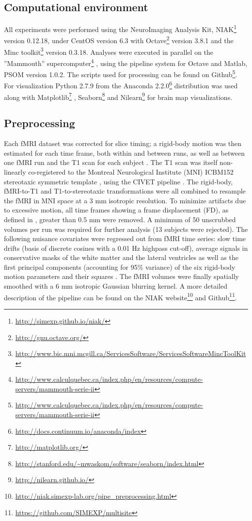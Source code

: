 \documentclass[authoryear]{elsarticle}
\begin{document}
\subsection{Computational environment}
All experiments were performed using the NeuroImaging Analysis Kit, NIAK\footnote{\url{http://simexp.github.io/niak/}} \citep{Bellec2011} version 0.12.18, under CentOS version 6.3 with Octave\footnote{\url{http://gnu.octave.org/}} version 3.8.1 and the Minc toolkit\footnote{\url{http://www.bic.mni.mcgill.ca/ServicesSoftware/ServicesSoftwareMincToolKit}} version 0.3.18. Analyses were executed in parallel on the ”Mammouth” supercomputer\footnote{\url{http://www.calculquebec.ca/index.php/en/resources/compute-servers/mammouth-serie-ii}} , using the pipeline system for Octave and Matlab, PSOM \citep{Bellec2012} version 1.0.2. The scripts used for processing can be found on Github\footnote{\url{http://www.calculquebec.ca/index.php/en/resources/compute-servers/mammouth-serie-ii}}. For visualization Python 2.7.9 from the Anaconda 2.2.0\footnote{\url{http://docs.continuum.io/anaconda/index}} distribution was used along with Matplotlib\footnote{\url{http://matplotlib.org/}} \citep{matplotlib}, Seaborn\footnote{\url{http://stanford.edu/~mwaskom/software/seaborn/index.html}} and Nilearn\footnote{\url{http://nilearn.github.io/}} for brain map visualizations.

\subsection{Preprocessing}
Each fMRI dataset was corrected for slice timing; a rigid-body motion was then estimated for each time frame, both within and between runs, as well as between one fMRI run and the T1 scan for each subject \citep{Collins1994}. The T1 scan was itself non-linearly co-registered to the Montreal Neurological Institute (MNI) ICBM152 stereotaxic symmetric template \citep{Fonov2011}, using the CIVET pipeline \citep{Ad-Dab'bagh2006}. The rigid-body, fMRI-to-T1 and T1-to-stereotaxic transformations were all combined to resample the fMRI in MNI space at a 3 mm isotropic resolution. To minimize artifacts due to excessive motion, all time frames showing a frame displacement (FD), as defined in \cite{Power2012}, greater than 0.5 mm were removed. A minimum of 50 unscrubbed volumes per run was required for further analysis (13 subjects were rejected). The following nuisance covariates were regressed out from fMRI time series: slow time drifts (basis of discrete cosines with a 0.01 Hz highpass cut-off), average signals in conservative masks of the white matter and the lateral ventricles as well as the first principal components (accounting for 95\% variance) of the six rigid-body motion parameters and their squares \citep{Giove2009,Lund2006}. The fMRI volumes were finally spatially smoothed with a 6 mm isotropic Gaussian blurring kernel. A more detailed description of the pipeline can be found on the NIAK website\footnote{\url{http://niak.simexp-lab.org/pipe_preprocessing.html}} and Github\footnote{\url{https://github.com/SIMEXP/multisite}}.
\end{document}
